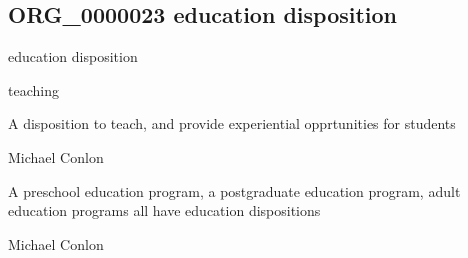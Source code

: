 \documentclass[letterpaper,10pt,english]{sphinxmanual}
\begin{document}
\subsection{ORG\_0000023 \sphinxhyphen{} education disposition}
\label{\detokenize{doc-ORG_0000023:org-0000023-education-disposition}}\label{\detokenize{doc-ORG_0000023:index-0}}\label{\detokenize{doc-ORG_0000023::doc}}
\begin{sphinxShadowBox}

\sphinxAtStartPar
education disposition
\end{sphinxShadowBox}

\begin{sphinxShadowBox}

\sphinxAtStartPar
teaching
\end{sphinxShadowBox}

\begin{sphinxShadowBox}

\sphinxAtStartPar
{\hyperref[\detokenize{doc-BFO_0000016::doc}]{}}
\end{sphinxShadowBox}

\begin{sphinxShadowBox}

\sphinxAtStartPar
A disposition to teach, and provide experiential opprtunities for students
\end{sphinxShadowBox}

\begin{sphinxShadowBox}

\sphinxAtStartPar
Michael Conlon 
\end{sphinxShadowBox}

\begin{sphinxShadowBox}

\sphinxAtStartPar
A pre\sphinxhyphen{}school education program, a post\sphinxhyphen{}graduate education program, adult education programs all have education dispositions
\end{sphinxShadowBox}

\begin{sphinxShadowBox}

\sphinxAtStartPar
Michael Conlon 
\end{sphinxShadowBox}
\begin{quote}

\ignorespaces \end{quote}
\end{document}

